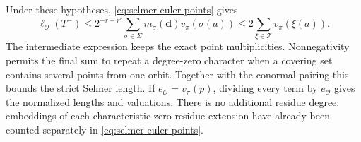 Under these hypotheses, \eqref{eq:selmer-euler-points} gives
\begin{equation}
 \ell_{\mathcal O}(T^-)
 \le 2^{-r-r'}\sum_{\sigma\in\Sigma}
 m_\sigma(\boldsymbol d)v_\pi(\sigma(a))
 \le 2\sum_{\xi\in\mathcal T}v_\pi(\xi(a)).
 \label{eq:selmer-euler-refined-bound}
\end{equation}
The intermediate expression keeps the exact point multiplicities.
Nonnegativity permits the final sum to repeat a degree-zero character
when a covering set contains several points from one orbit. Together with
the conormal pairing this bounds the strict Selmer length. If
$e_{\mathcal O}=v_\pi(p)$, dividing every term by $e_{\mathcal O}$ gives
the normalized lengths and valuations. There is no additional residue
degree: embeddings of each characteristic-zero residue extension have
already been counted separately in \eqref{eq:selmer-euler-points}.
